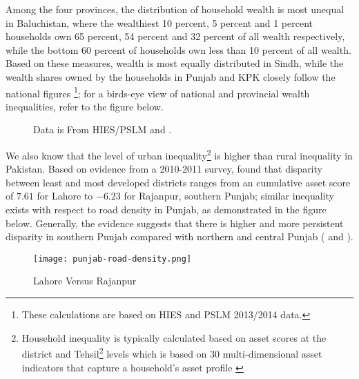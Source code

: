 \documentclass[12pt]{article}
\newcommand{\1}{\mathbbm 1}
\begin{document}
	 
	 Among the four provinces, the distribution of household wealth is most unequal in Baluchistan, where the wealthiest 10 percent, 5 percent and 1 percent households own 65 percent, 54 percent and 32 percent of all wealth respectively, while the bottom 60 percent of households own less than 10 percent of all wealth. Based on these measures, wealth is most equally distributed in Sindh, while the wealth shares owned by the households in Punjab and KPK closely follow the national figures \cite{burki2021LUMS}\footnote{These calculations are based on HIES and PSLM 2013/2014 data.}; for a birds-eye view of national and provincial wealth inequalities, refer to the figure below.
	 
	 
	 \begin{figure}[H]
	 	\centering
	 	\scalebox{0.8}{}
	 	\hfill
	 	\caption{Data is From HIES/PSLM and \cite{burki2021LUMS}.}
	 \end{figure}
	 
	 
	
	We also know that the level of urban inequality\footnote{Household inequality is typically calculated based on asset scores at the district and Tehsil\footnote{Sub-district level regional classification in Pakistan.} levels which is based on 30 multi-dimensional asset indicators that capture a household's asset profile \cite{burki2015multiple}} is higher than rural inequality in Pakistan. Based on evidence from a 2010-2011 survey, \cite{burki2015multiple} found that disparity between least and most developed districts ranges from an cumulative asset score of $7.61$ for Lahore to $-6.23$ for Rajanpur, southern Punjab; similar inequality exists with respect to road density in Punjab, as demonstrated in the figure below. Generally, the evidence suggests that there is higher and more persistent disparity in southern Punjab compared with northern and central Punjab (\cite{mohey2017exploring} and \cite{burki2021LUMS}).
	
	
	\begin{figure}[H]
		\begin{center}
			\texttt{[image: punjab-road-density.png]}		
			\caption{Lahore Versus Rajanpur \cite{burki2015multiple}}
		\end{center}
	\end{figure}
	
	

	
	
	

	
	
\end{document}
